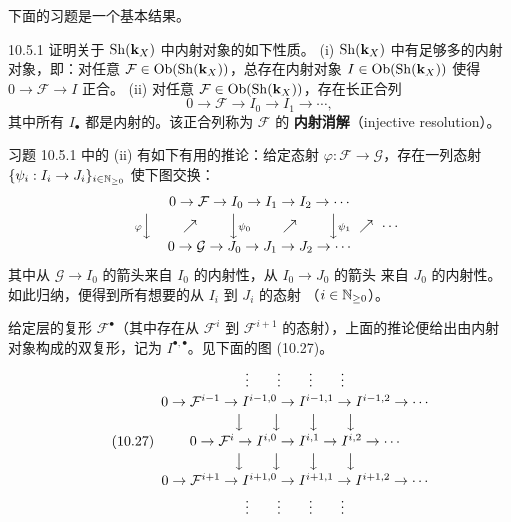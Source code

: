 
下面的习题是一个基本结果。

\begin{wexer}{10.5.1}
证明关于 $\operatorname{Sh}(\mathbf{k}_X)$ 中内射对象的如下性质。
(i) $\operatorname{Sh}(\mathbf{k}_X)$ 中有足够多的内射对象，即：对任意
$\mathcal F\in\operatorname{Ob}(\operatorname{Sh}(\mathbf{k}_X))$，总存在内射对象
$I\in\operatorname{Ob}(\operatorname{Sh}(\mathbf{k}_X))$ 使得 $0\to\mathcal F\to I$ 正合。
(ii) 对任意 $\mathcal F\in\operatorname{Ob}(\operatorname{Sh}(\mathbf{k}_X))$，存在长正合列
\begin{equation}\tag{10.26}
  0\to\mathcal F\to I_0\to I_1\to\cdots,
\end{equation}
其中所有 $I_{\bullet}$ 都是内射的。该正合列称为 $\mathcal F$ 的
\textbf{内射消解}（injective resolution）。
\end{wexer}

习题 10.5.1 中的 (ii) 有如下有用的推论：给定态射
$\varphi:\mathcal F\to\mathcal G$，存在一列态射
$\{\psi_i:I_i\to J_i\}_{i\in\mathbb{N}_{\ge0}}$ 使下图交换：
\[
\begin{array}{c}
0\to\mathcal F\to I_0\to I_1\to I_2\to\cdots\\[2pt]
\quad{\scriptstyle\varphi}\Big\downarrow\qquad
\nearrow\qquad
\Big\downarrow{\scriptstyle\psi_0}\qquad
\nearrow\qquad
\Big\downarrow{\scriptstyle\psi_1}\ \nearrow\ \cdots\\[2pt]
0\to\mathcal G\to J_0\to J_1\to J_2\to\cdots
\end{array}
\]
其中从 $\mathcal G\to I_0$ 的箭头来自 $I_0$ 的内射性，从 $I_0\to J_0$ 的箭头
来自 $J_0$ 的内射性。如此归纳，便得到所有想要的从 $I_i$ 到 $J_i$ 的态射
（$i\in\mathbb{N}_{\ge0}$）。

给定层的复形 $\mathcal F^{\bullet}$（其中存在从 $\mathcal F^i$ 到
$\mathcal F^{i+1}$ 的态射），上面的推论便给出由内射对象构成的双复形，记为
$I^{\bullet,\bullet}$。见下面的图 (10.27)。
\begin{equation}\tag{10.27}
\begin{array}{c}
\vdots\qquad\vdots\qquad\vdots\qquad\vdots\\[2pt]
0\to\mathcal F^{i-1}\to I^{i-1,0}\to I^{i-1,1}\to I^{i-1,2}\to\cdots\\[2pt]
\big\downarrow\qquad\big\downarrow\qquad\big\downarrow\qquad\big\downarrow\\[2pt]
0\to\mathcal F^{i}\to I^{i,0}\to I^{i,1}\to I^{i,2}\to\cdots\\[2pt]
\big\downarrow\qquad\big\downarrow\qquad\big\downarrow\qquad\big\downarrow\\[2pt]
0\to\mathcal F^{i+1}\to I^{i+1,0}\to I^{i+1,1}\to I^{i+1,2}\to\cdots\\[2pt]
\vdots\qquad\vdots\qquad\vdots\qquad\vdots
\end{array}
\end{equation}

